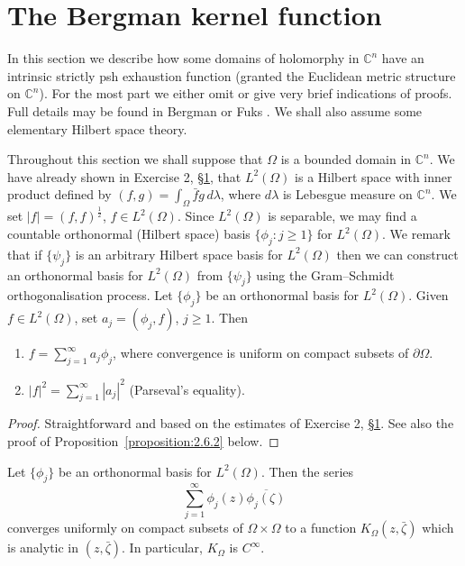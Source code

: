 \section{The Bergman kernel function}\label{sec:2:6}
In this section we describe how some domains of holomorphy in $\mathbb C^n$ have an intrinsic strictly psh exhaustion function (granted the Euclidean metric structure on $\mathbb C^n$). For the most part we either omit or give very brief indications of proofs. Full details may be found in Bergman \cite{bib:I:bergman-s:1,bib:I:bergman-s:2} or Fuks \cite{bib:I:fuks-b-a:1}. We shall also assume some elementary Hilbert space theory.

Throughout this section we shall suppose that $\Omega$ is a bounded domain in $\mathbb C^n$. We have already shown in Exercise 2, \hyperref[sec:2:1]{\S1}, that $L^2(\Omega)$ is a Hilbert space with inner product defined by $(f,g)=\int_\Omega\bar f g\,d\lambda$, where $d\lambda$ is Lebesgue measure on $\mathbb C^n$. We set $|f|=(f,f)^{\frac12}$, $f\in L^2(\Omega)$. Since $L^2(\Omega)$ is separable, we may find a countable orthonormal (Hilbert space) basis $\{\phi_j:j\geq1\}$ for $L^2(\Omega)$. We remark that if $\{\psi_j\}$ is an arbitrary Hilbert space basis for $L^2(\Omega)$ then we can construct an orthonormal basis for $L^2(\Omega)$ from $\{\psi_j\}$ using the Gram--Schmidt orthogonalisation process.
 Let $\{\phi_j\}$ be an orthonormal basis for $L^2(\Omega)$. Given $f\in L^2(\Omega)$, set $a_j=(\phi_j,f)$, $j\geq1$. Then
\begin{enumerate}
\item $f=\sum_{j=1}^\infty a_j\phi_j$, where convergence is uniform on compact subsets of $\partial\Omega$.
\item $|f|^2=\sum_{j=1}^\infty|a_j|^2$ (Parseval's equality).
\end{enumerate}
\begin{proof}
Straightforward and based on the estimates of Exercise 2, \hyperref[sec:2:1]{\S1}. See also the proof of Proposition~\ref{proposition:2.6.2} below.
\end{proof}
 Let $\{\phi_j\}$ be an orthonormal basis for $L^2(\Omega)$. Then the series
\[\sum_{j=1}^\infty\phi_j(z)\overline{\phi_j(\zeta)}\]
converges uniformly on compact subsets of $\Omega\times\Omega$ to a function $K_\Omega(z,\bar\zeta)$ which is analytic in $(z,\bar\zeta)$. In particular, $K_\Omega$ is $C^\infty$.
